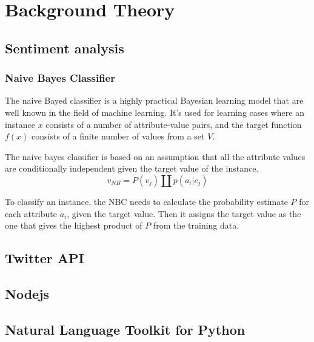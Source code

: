\section{Background Theory}
	\subsection{Sentiment analysis}
		\subsubsection{Naive Bayes Classifier}
		The naive Bayed classifier is a highly practical Bayesian learning model that are well known in the field of machine learning. It's used for learning cases where an instance $x$ consists of a number of attribute-value pairs, and the target function $f(x)$ consists of a finite number of values from a set $V$.

The naive bayes classifier is based on an assumption that all the attribute values are conditionally independent given the target value of the instance.
\begin{equation}
\label{equation:nbc}
v_{NB} = P(v_j) \amalg p(a_i|c_j)
\end{equation}

To classify an instance, the NBC needs to calculate the probability estimate $P$ for each attribute $a_i$, given the target value. Then it assigns the target value as the one that gives the highest product of $P$ from the training data.
	\subsection{Twitter API}
	\subsection{Nodejs}
	\subsection{Natural Language Toolkit for Python}